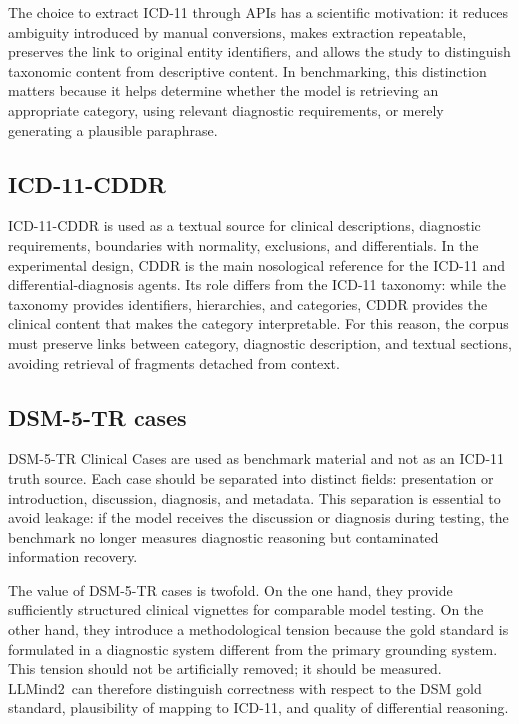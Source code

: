 \documentclass[11pt,a4paper]{article}
\newcommand{\llmind}{LLMind2}
\begin{document}
The choice to extract ICD-11 through APIs has a scientific motivation: it reduces ambiguity introduced by manual conversions, makes extraction repeatable, preserves the link to original entity identifiers, and allows the study to distinguish taxonomic content from descriptive content. In benchmarking, this distinction matters because it helps determine whether the model is retrieving an appropriate category, using relevant diagnostic requirements, or merely generating a plausible paraphrase.

\subsection{ICD-11-CDDR}
ICD-11-CDDR is used as a textual source for clinical descriptions, diagnostic requirements, boundaries with normality, exclusions, and differentials. In the experimental design, CDDR is the main nosological reference for the ICD-11 and differential-diagnosis agents. Its role differs from the ICD-11 taxonomy: while the taxonomy provides identifiers, hierarchies, and categories, CDDR provides the clinical content that makes the category interpretable. For this reason, the corpus must preserve links between category, diagnostic description, and textual sections, avoiding retrieval of fragments detached from context.

\subsection{DSM-5-TR cases}
DSM-5-TR Clinical Cases are used as benchmark material and not as an ICD-11 truth source. Each case should be separated into distinct fields: presentation or introduction, discussion, diagnosis, and metadata. This separation is essential to avoid leakage: if the model receives the discussion or diagnosis during testing, the benchmark no longer measures diagnostic reasoning but contaminated information recovery.

The value of DSM-5-TR cases is twofold. On the one hand, they provide sufficiently structured clinical vignettes for comparable model testing. On the other hand, they introduce a methodological tension because the gold standard is formulated in a diagnostic system different from the primary grounding system. This tension should not be artificially removed; it should be measured. \llmind\ can therefore distinguish correctness with respect to the DSM gold standard, plausibility of mapping to ICD-11, and quality of differential reasoning.
\end{document}
